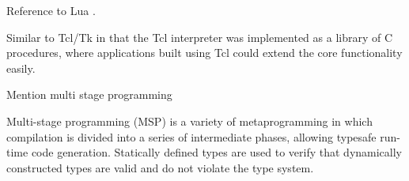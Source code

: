 

Reference to Lua \cite{Lua2011}.

Similar to Tcl/Tk \cite{Ousterhout2009} in that the Tcl interpreter 
was implemented as a library of C procedures, where applications 
built using Tcl could extend the core functionality easily.

Mention multi stage programming

Multi-stage programming (MSP) is a variety of metaprogramming in which
compilation is divided into a series of intermediate phases, allowing typesafe
run-time code generation. Statically defined types are used to verify that
dynamically constructed types are valid and do not violate the type system.
